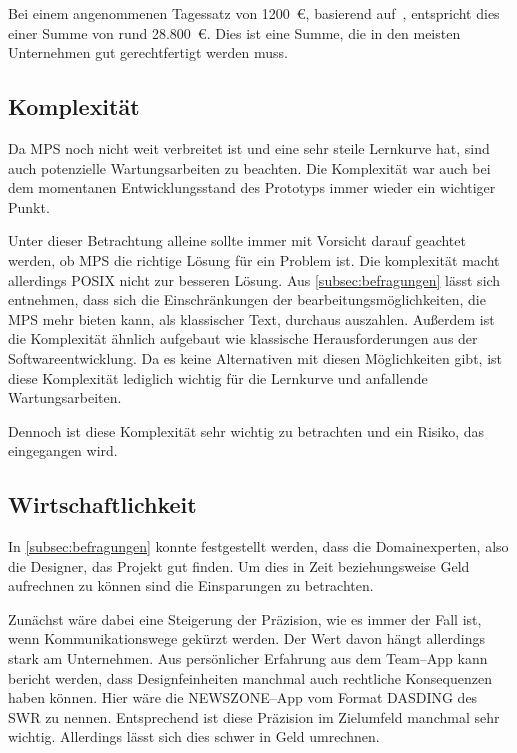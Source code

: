 Bei einem angenommenen Tagessatz von 1200~\euro, basierend auf~\cite{metrics-germany-gmbh-2021}, entspricht dies einer Summe von rund 28.800~\euro.
Dies ist eine Summe, die in den meisten Unternehmen gut gerechtfertigt werden muss.

\subsection{Komplexität}\label{subsec:komplexitat}
Da \ac{MPS} noch nicht weit verbreitet ist und eine sehr steile Lernkurve hat, sind auch potenzielle Wartungsarbeiten zu beachten.
Die Komplexität war auch bei dem momentanen Entwicklungsstand des Prototyps immer wieder ein wichtiger Punkt.

Unter dieser Betrachtung alleine sollte immer mit Vorsicht darauf geachtet werden, ob \ac{MPS} die richtige Lösung für ein Problem ist.
Die komplexität macht allerdings \ac{POSIX} nicht zur besseren Lösung.
Aus \autoref{subsec:befragungen} lässt sich entnehmen, dass sich die Einschränkungen der bearbeitungsmöglichkeiten, die \ac{MPS} mehr bieten kann, als klassischer Text, durchaus auszahlen.
Außerdem ist die Komplexität ähnlich aufgebaut wie klassische Herausforderungen aus der Softwareentwicklung.
Da es keine Alternativen mit diesen Möglichkeiten gibt, ist diese Komplexität lediglich wichtig für die Lernkurve und anfallende Wartungsarbeiten.

Dennoch ist diese Komplexität sehr wichtig zu betrachten und ein Risiko, das eingegangen wird.

\subsection{Wirtschaftlichkeit}\label{subsec:wirtschaftlichkeit}
In \autoref{subsec:befragungen} konnte festgestellt werden, dass die Domainexperten, also die Designer, das Projekt gut finden.
Um dies in Zeit beziehungsweise Geld aufrechnen zu können sind die Einsparungen zu betrachten.

Zunächst wäre dabei eine Steigerung der Präzision, wie es immer der Fall ist, wenn Kommunikationswege gekürzt werden.
Der Wert davon hängt allerdings stark am Unternehmen.
Aus persönlicher Erfahrung aus dem Team--App kann bericht werden, dass Designfeinheiten manchmal auch rechtliche Konsequenzen haben können. %
Hier wäre die NEWSZONE--App vom Format DASDING des \ac{SWR} zu nennen.
Entsprechend ist diese Präzision im Zielumfeld manchmal sehr wichtig.
Allerdings lässt sich dies schwer in Geld umrechnen.


